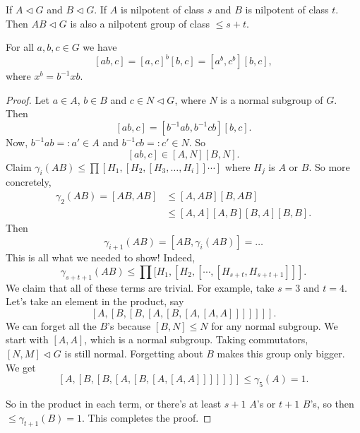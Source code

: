 \begin{theorem}[16.2.12, Fitting]
    If $A \triangleleft G$ and $B \triangleleft G$. If $A$ is nilpotent of class $s$ and $B$ is nilpotent of class $t$.
    Then $AB \triangleleft G$ is also a nilpotent group of class  $\le s + t$.
\end{theorem}
\begin{remark}
    For all $a, b, c \in G$ we have
    \[
        [ab, c] = [a,c]^{b} [b,c] = [a^{b}, c^{b}] [b, c]
    ,\] 
    where $x^{b} = b^{-1} x b$.
\end{remark}
\begin{proof}
    Let $a \in A$, $ b \in B$ and $c \in N\triangleleft G$, where $N$ is a normal subgroup of  $G$.
    Then
    \[
        [ab, c] = [b^{-1}ab, b^{-1} c b][b, c]
    .\] 
    Now, $b^{-1} a b =: a'\in A$ and $b^{-1} c b=: c' \in N$.
    So
    \[
    [ab, c] \in  [A, N][B, N]
    .\] 
    Claim $\gamma_i(AB) \le  \prod [H_1, [H_2, [H_3, \ldots, H_i]]\cdots]$ where $H_j$ is  $A$ or  $B$.
    So more concretely, 
    \begin{align*}
        \gamma_2(AB) = [AB, AB] &\le  [A, AB] [B, AB]\\
                                &\le  [A, A] [A, B] [ B,A] [B, B]
    .\end{align*} 
    Then
    \[
        \gamma_{i+1}(AB) = [AB, \gamma_i(AB)] = \ldots
    \] 
    This is all what we needed to show!
    Indeed,
    \[
        \gamma_{s+t+1}(AB) \le  \prod [H_1, [H_2, [\cdots, [H_{s+t}, H_{s+t+1}]] ]
    .\] 
    We claim that all of these terms are trivial.
    For example, take $s = 3$ and  $t = 4$.
    Let's take an element in the product, say
     \[
         [A, [B, [B, [A, [B, [A, [A, A]]]]]]]
    .\] 
    We can forget all the $B$'s because  $[B, N] \le  N$ for any normal subgroup. We start with $[A, A]$, which is a normal subgroup. Taking commutators,  $[N, M] \triangleleft G$ is still normal.
    Forgetting about $B$ makes this group only bigger. 
    We get
    \[
        [A, [B, [B, [A, [B, [A, [A, A]]]]]]] \le \gamma_5(A) = 1
    .\] 

    So in the product in each term, or there's at least $s+1$  $A$'s or  $t+1$  $B$'s, so then  $\le  \gamma_{t+1}(B) = 1$.
    This completes the proof.
\end{proof}
